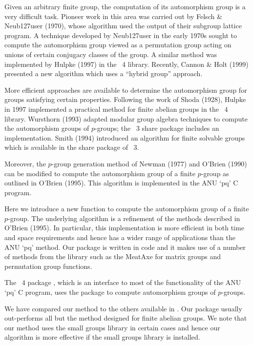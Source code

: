 

Given an arbitrary finite group, the computation of its automorphism
group is a very difficult task. Pioneer work in this area was carried 
out by Felsch \&  Neub{\accent127u}ser (1970), whose algorithm used 
the output of their subgroup lattice program. A technique developed 
by Neub{\accent127u}ser in the early 1970s sought to compute the 
automorphism group viewed as a permutation group acting on unions of 
certain conjugacy classes of the group. A similar method was implemented 
by Hulpke (1997) in the {\GAP}~4 library. Recently, Cannon \& Holt (1999) 
presented a new algorithm which uses a ``hybrid group'' approach. 

More efficient approaches are available to determine the automorphism 
group for groups satisfying certain properties. Following the work of 
Shoda (1928), Hulpke in 1997 implemented a practical method for finite 
abelian groups in the {\GAP}~4 library. Wursthorn (1993) adapted modular 
group algebra techniques to compute the automorphism groups of $p$-groups; 
the {\GAP}~3 share package  includes an implementation. Smith 
(1994) introduced an algorithm for finite solvable groups which is 
available in the  share package of {\GAP}~3. 

Moreover, the $p$-group generation method of Newman (1977) and O'Brien 
(1990) can be modified to compute the automorphism group of a finite 
$p$-group as outlined in O'Brien (1995). This algorithm is implemented 
in the ANU `pq' C program. 

Here we introduce a new function to compute the automorphism group of 
a finite $p$-group. The underlying algorithm is a refinement of the
methods described in O'Brien (1995). In particular, this implementation
is more efficient in both time and space requirements and hence has a 
wider range of applications than the ANU `pq' method. Our package is 
written in {\GAP} code and it makes use of a number of methods from the 
{\GAP} library such as the MeatAxe for matrix groups and 
permutation group functions. 

The {\GAP}~4 package , which is an interface to most of
the functionality of the ANU `pq' C program, uses the {\AutPGrp} package
to compute automorphism groups of $p$-groups.

We have compared our method to the others available in {\GAP}.
Our package usually out-performs all but the method designed 
for finite abelian groups. We note that our method uses the 
small groups library in certain cases and hence our algorithm
is more effective if the small groups library is installed.

